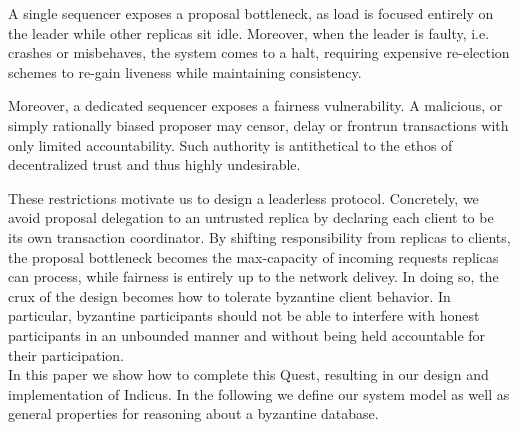 A single sequencer exposes a proposal bottleneck, as load is focused entirely on the leader while other replicas sit idle. Moreover, when the leader is faulty, i.e. crashes or misbehaves, the system comes to a halt, requiring expensive re-election schemes to re-gain liveness while maintaining consistency. 

Moreover, a dedicated sequencer exposes a fairness vulnerability. A malicious, or simply rationally biased proposer may censor, delay or frontrun transactions with only limited accountability. Such authority is antithetical to the ethos of decentralized trust and thus highly undesirable. 

These restrictions motivate us to design a leaderless protocol. Concretely, we avoid proposal delegation to an untrusted replica by declaring each client to be its own transaction coordinator.
By shifting responsibility from replicas to clients, the proposal bottleneck becomes the max-capacity of incoming requests replicas can process, while fairness is entirely up to the network delivey. In doing so, the crux of the design becomes how to tolerate byzantine client behavior. In particular, byzantine participants should not be able to interfere with honest participants in an unbounded manner and without being held accountable for their participation. \\


In this paper we show how to complete this Quest, resulting in our design and implementation of Indicus. In the following we define our system model as well as general properties for reasoning about a byzantine database.